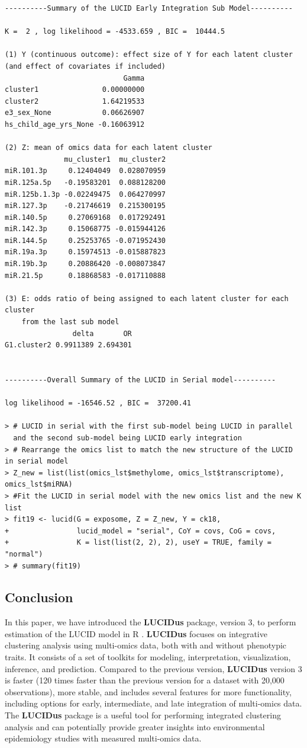 \begin{verbatim}
----------Summary of the LUCID Early Integration Sub Model---------- 
 
K =  2 , log likelihood = -4533.659 , BIC =  10444.5 
 
(1) Y (continuous outcome): effect size of Y for each latent cluster 
(and effect of covariates if included) 
                            Gamma
cluster1               0.00000000
cluster2               1.64219533
e3_sex_None            0.06626907
hs_child_age_yrs_None -0.16063912

(2) Z: mean of omics data for each latent cluster 
              mu_cluster1  mu_cluster2
miR.101.3p     0.12404049  0.028070959
miR.125a.5p   -0.19583201  0.088128200
miR.125b.1.3p -0.02249475  0.064270997
miR.127.3p    -0.21746619  0.215300195
miR.140.5p     0.27069168  0.017292491
miR.142.3p     0.15068775 -0.015944126
miR.144.5p     0.25253765 -0.071952430
miR.19a.3p     0.15974513 -0.015887823
miR.19b.3p     0.20886420 -0.008073847
miR.21.5p      0.18868583 -0.017110888

(3) E: odds ratio of being assigned to each latent cluster for each cluster 
    from the last sub model 
                delta       OR
G1.cluster2 0.9911389 2.694301

 
----------Overall Summary of the LUCID in Serial model---------- 
 
log likelihood = -16546.52 , BIC =  37200.41 

> # LUCID in serial with the first sub-model being LUCID in parallel 
  and the second sub-model being LUCID early integration
> # Rearrange the omics list to match the new structure of the LUCID in serial model
> Z_new = list(list(omics_lst$methylome, omics_lst$transcriptome), omics_lst$miRNA)
> #Fit the LUCID in serial model with the new omics list and the new K list 
> fit19 <- lucid(G = exposome, Z = Z_new, Y = ck18, 
+                lucid_model = "serial", CoY = covs, CoG = covs, 
+                K = list(list(2, 2), 2), useY = TRUE, family = "normal")
> # summary(fit19)
\end{verbatim}

\subsection{Conclusion}\label{conclusion}

In this paper, we have introduced the \textbf{LUCIDus} package, version 3, to
perform estimation of the LUCID model in R \citep{LUCIDus}. \textbf{LUCIDus}
focuses on integrative clustering analysis using multi-omics data, both
with and without phenotypic traits. It consists of a set of toolkits for
modeling, interpretation, visualization, inference, and prediction.
Compared to the previous version, \textbf{LUCIDus} version 3 is faster (120
times faster than the previous version for a dataset with 20,000
observations), more stable, and includes several features for more
functionality, including options for early, intermediate, and late
integration of multi-omics data. The \textbf{LUCIDus} package is a useful
tool for performing integrated clustering analysis and can potentially
provide greater insights into environmental epidemiology studies with
measured multi-omics data.

